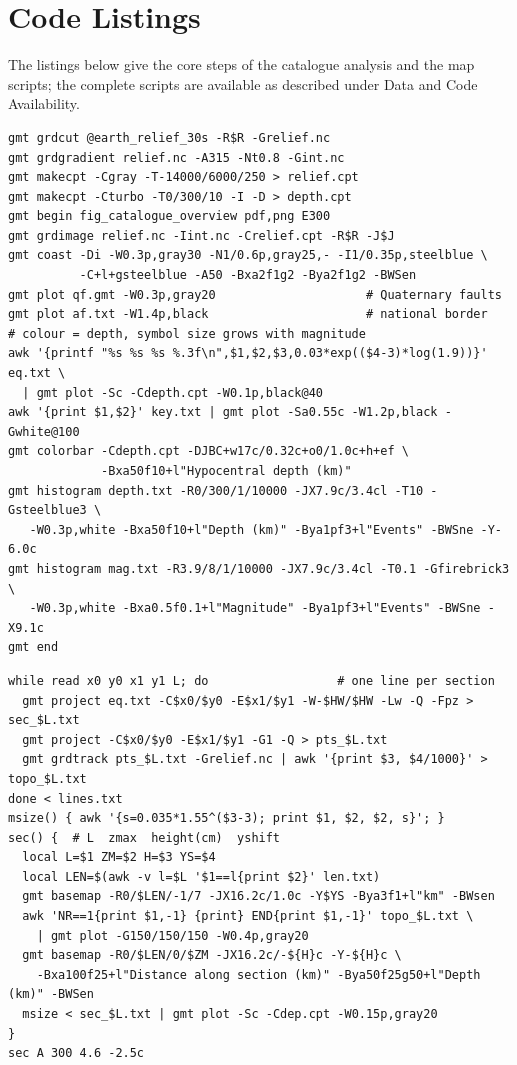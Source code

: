 \documentclass[11pt]{article}
\begin{document}
\appendix
\section{Code Listings}\label{secA1}

The listings below give the core steps of the catalogue analysis and the map
scripts; the complete scripts are available as described under Data and Code
Availability.

\begin{lstlisting}[style=sh,caption={GMT script for the depth-coloured
seismicity map with depth and magnitude histograms (GMT 6.6.0; excerpt of
fig\_catalogue\_overview.sh).},label={lst:seismap}]
gmt grdcut @earth_relief_30s -R$R -Grelief.nc
gmt grdgradient relief.nc -A315 -Nt0.8 -Gint.nc
gmt makecpt -Cgray -T-14000/6000/250 > relief.cpt
gmt makecpt -Cturbo -T0/300/10 -I -D > depth.cpt
gmt begin fig_catalogue_overview pdf,png E300
gmt grdimage relief.nc -Iint.nc -Crelief.cpt -R$R -J$J
gmt coast -Di -W0.3p,gray30 -N1/0.6p,gray25,- -I1/0.35p,steelblue \
          -C+l+gsteelblue -A50 -Bxa2f1g2 -Bya2f1g2 -BWSen
gmt plot qf.gmt -W0.3p,gray20                     # Quaternary faults
gmt plot af.txt -W1.4p,black                      # national border
# colour = depth, symbol size grows with magnitude
awk '{printf "%s %s %s %.3f\n",$1,$2,$3,0.03*exp(($4-3)*log(1.9))}' eq.txt \
  | gmt plot -Sc -Cdepth.cpt -W0.1p,black@40
awk '{print $1,$2}' key.txt | gmt plot -Sa0.55c -W1.2p,black -Gwhite@100
gmt colorbar -Cdepth.cpt -DJBC+w17c/0.32c+o0/1.0c+h+ef \
             -Bxa50f10+l"Hypocentral depth (km)"
gmt histogram depth.txt -R0/300/1/10000 -JX7.9c/3.4cl -T10 -Gsteelblue3 \
   -W0.3p,white -Bxa50f10+l"Depth (km)" -Bya1pf3+l"Events" -BWSne -Y-6.0c
gmt histogram mag.txt -R3.9/8/1/10000 -JX7.9c/3.4cl -T0.1 -Gfirebrick3 \
   -W0.3p,white -Bxa0.5f0.1+l"Magnitude" -Bya1pf3+l"Events" -BWSne -X9.1c
gmt end
\end{lstlisting}

\begin{lstlisting}[style=sh,caption={GMT projection of hypocentres and topography
onto the section lines and plotting of one depth section (GMT 6.6.0; excerpt of
fig\_depth\_sections.sh).},label={lst:sections}]
while read x0 y0 x1 y1 L; do                  # one line per section
  gmt project eq.txt -C$x0/$y0 -E$x1/$y1 -W-$HW/$HW -Lw -Q -Fpz > sec_$L.txt
  gmt project -C$x0/$y0 -E$x1/$y1 -G1 -Q > pts_$L.txt
  gmt grdtrack pts_$L.txt -Grelief.nc | awk '{print $3, $4/1000}' > topo_$L.txt
done < lines.txt
msize() { awk '{s=0.035*1.55^($3-3); print $1, $2, $2, s}'; }
sec() {  # L  zmax  height(cm)  yshift
  local L=$1 ZM=$2 H=$3 YS=$4
  local LEN=$(awk -v l=$L '$1==l{print $2}' len.txt)
  gmt basemap -R0/$LEN/-1/7 -JX16.2c/1.0c -Y$YS -Bya3f1+l"km" -BWsen
  awk 'NR==1{print $1,-1} {print} END{print $1,-1}' topo_$L.txt \
    | gmt plot -G150/150/150 -W0.4p,gray20
  gmt basemap -R0/$LEN/0/$ZM -JX16.2c/-${H}c -Y-${H}c \
    -Bxa100f25+l"Distance along section (km)" -Bya50f25g50+l"Depth (km)" -BWSen
  msize < sec_$L.txt | gmt plot -Sc -Cdep.cpt -W0.15p,gray20
}
sec A 300 4.6 -2.5c
\end{lstlisting}
\end{document}
